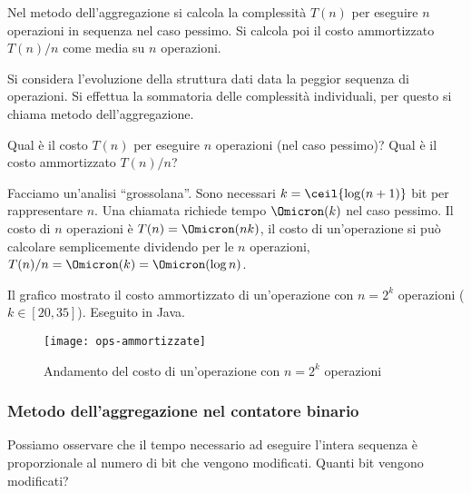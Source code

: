 Nel metodo dell'aggregazione si calcola la complessità \(T(n)\) per eseguire \(n\) operazioni in sequenza nel caso pessimo.
Si calcola poi il costo ammortizzato \(T(n)/n\) come media su \(n\) operazioni.

Si considera l'evoluzione della struttura dati data la peggior sequenza di operazioni.
Si effettua la sommatoria delle complessità individuali, per questo si chiama metodo dell'aggregazione.

Qual è il costo \(T(n)\) per eseguire \(n\) operazioni (nel caso pessimo)?
Qual è il costo ammortizzato \(T(n)/n\)?

Facciamo un'analisi \enquote{grossolana}.
Sono necessari \(k = \ceil{\log(n+1)}\) bit per rappresentare \(n\).
Una chiamata \increment{} richiede tempo \(\Omicron(k)\) nel caso pessimo.
Il costo di \(n\) operazioni è \(T(n) = \Omicron(nk)\), il costo di un'operazione si può calcolare semplicemente dividendo per le \(n\) operazioni, \(T(n)/n = \Omicron(k) = \Omicron(\log n)\).

Il grafico mostrato il costo ammortizzato di un'operazione con \(n = 2^k\) operazioni (\(k \in [20, 35]\)).
Eseguito in Java.

\begin{figure}[!ht]\centering
    \texttt{[image: ops-ammortizzate]}
    \caption{Andamento del costo di un'operazione con \(n = 2^k\) operazioni}\label{fig:ops-ammortizzate}
\end{figure}

\subsubsection{Metodo dell'aggregazione nel contatore binario}

Possiamo osservare che il tempo necessario ad eseguire l'intera sequenza è proporzionale al numero di bit che vengono modificati.
Quanti bit vengono modificati?

\newcommand{\diff}[1]{\textcolor{red}{\textbf{#1}}}

